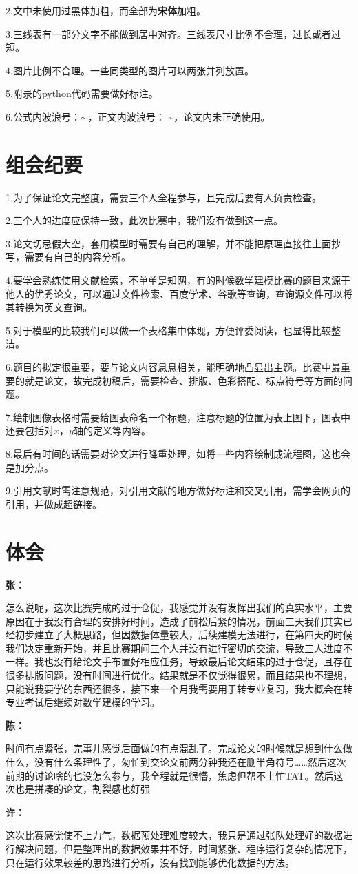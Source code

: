 \documentclass{MathModeling}
\begin{document}
	2.文中未使用过{\heiti 黑体加粗}，而全部为\textbf{宋体}加粗。

	3.三线表有一部分文字不能做到居中对齐。三线表尺寸比例不合理，过长或者过短。

	4.图片比例不合理。一些同类型的图片可以两张并列放置。

	5.附录的python代码需要做好标注。

	6.公式内波浪号：$\sim$，正文内波浪号： \textasciitilde，论文内未正确使用。
	\section{组会纪要}
	1.为了保证论文完整度，需要三个人全程参与，且完成后要有人负责检查。

	2.三个人的进度应保持一致，此次比赛中，我们没有做到这一点。

	3.论文切忌假大空，套用模型时需要有自己的理解，并不能把原理直接往上面抄写，需要有自己的内容分析。

	4.要学会熟练使用文献检索，不单单是知网，有的时候数学建模比赛的题目来源于他人的优秀论文，可以通过文件检索、百度学术、谷歌等查询，查询源文件可以将其转换为英文查询。

	5.对于模型的比较我们可以做一个表格集中体现，方便评委阅读，也显得比较整洁。

	6.题目的拟定很重要，要与论文内容息息相关，能明确地凸显出主题。比赛中最重要的就是论文，故完成初稿后，需要检查、排版、色彩搭配、标点符号等方面的问题。

	7.绘制图像表格时需要给图表命名一个标题，注意标题的位置为表上图下，图表中还要包括对$x$，$y$轴的定义等内容。

	8.最后有时间的话需要对论文进行降重处理，如将一些内容绘制成流程图，这也会是加分点。

	9.引用文献时需注意规范，对引用文献的地方做好标注和交叉引用，需学会网页的引用，并做成超链接。

	\section{体会}
	\textbf{张：}

	怎么说呢，这次比赛完成的过于仓促，我感觉并没有发挥出我们的真实水平，主要原因在于我没有合理的安排好时间，造成了前松后紧的情况，前面三天我们其实已经初步建立了大概思路，但因数据体量较大，后续建模无法进行，在第四天的时候我们决定重新开始，并且比赛期间三个人并没有进行密切的交流，导致三人进度不一样。我也没有给论文手布置好相应任务，导致最后论文结束的过于仓促，且存在很多排版问题，没有时间进行优化。结果就是不仅觉得很累，而且结果也不理想，只能说我要学的东西还很多，接下来一个月我需要用于转专业复习，我大概会在转专业考试后继续对数学建模的学习。

	\textbf{陈：}
	
	时间有点紧张，完事儿感觉后面做的有点混乱了。完成论文的时候就是想到什么做什么，没有什么条理性了，匆忙到交论文前两分钟我还在删半角符号……然后这次前期的讨论啥的也没怎么参与，我全程就是很懵，焦虑但帮不上忙TAT。然后这次也是拼凑的论文，割裂感也好强

	\textbf{许：}
	
	这次比赛感觉使不上力气，数据预处理难度较大，我只是通过张队处理好的数据进行解决问题，但是整理出的数据效果并不好，时间紧张、程序运行复杂的情况下，只在运行效果较差的思路进行分析，没有找到能够优化数据的方法。
\end{document}
